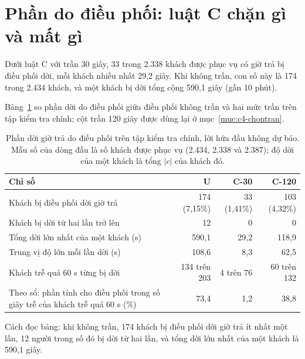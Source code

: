 \section{Phần do điều phối: luật C chặn gì và mất gì}
\label{muc:c4-dieuphoi}

Dưới luật C với trần 30 giây, 33 trong 2.338 khách được phục vụ có giờ trả bị điều phối dời, mỗi khách
nhiều nhất 29,2 giây. Khi không trần, con số này là 174 trong 2.434 khách, và một khách bị dời tổng cộng
590,1 giây (gần 10 phút).

Bảng~\ref{bang:c4-doidieuphoi} so phần dời do điều phối giữa điều phối không trần và hai mức trần trên
tập kiểm tra chính; cột trần 120 giây được dùng lại ở mục~\ref{muc:c4-chontran}.

\begin{table}[htbp]
\centering
\caption{Phần dời giờ trả do điều phối trên tập kiểm tra chính, lời hứa đầu không dự báo. Mẫu số của
dòng đầu là số khách được phục vụ (2.434, 2.338 và 2.387); độ dời của một khách là tổng $|c|$ của khách
đó.}
\label{bang:c4-doidieuphoi}
\small
\begin{tabular}{@{}p{7.6cm}rrr@{}}
\toprule
\textbf{Chỉ số} & \textbf{U} & \textbf{C-30} & \textbf{C-120}\\
\midrule
Khách bị điều phối dời giờ trả & 174 (7,15\%) & 33 (1,41\%) & 103 (4,32\%)\\
Khách bị dời từ hai lần trở lên & 12 & 0 & 0\\
Tổng dời lớn nhất của một khách (s) & 590,1 & 29,2 & 118,9\\
Trung vị độ lớn mỗi lần dời (s) & 108,6 & 8,3 & 62,5\\
Khách trễ quá 60 s từng bị dời & 134 trên 203 & 4 trên 76 & 60 trên 132\\
Theo sổ: phần tính cho điều phối trong số giây trễ của khách trễ quá 60 s (\%) & 73,4 & 1,2 & 38,8\\
\bottomrule
\end{tabular}
\end{table}

Cách đọc bảng: khi không trần, 174 khách bị điều phối dời giờ trả ít nhất một lần, 12 người trong số đó
bị dời từ hai lần, và tổng dời lớn nhất của một khách là 590,1 giây.


